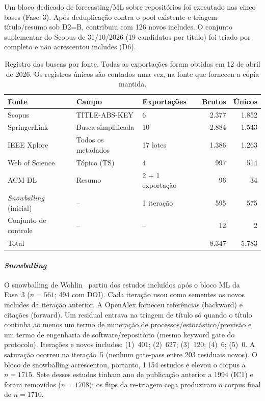 \documentclass[preprint,12pt,authoryear=false]{elsarticle}
\begin{document}
Um bloco dedicado de forecasting/ML sobre repositórios foi executado nas cinco bases (Fase~3). Após deduplicação contra o pool existente e triagem título/resumo sob D2=B, contribuiu com 126 novos includes. O conjunto suplementar do Scopus de 31/10/2026 (19 candidatos por título) foi triado por completo e não acrescentou includes (D6).

\begin{table}[t]
\centering\small
\caption{Registro das buscas por fonte. Todas as exportações foram obtidas em 12 de abril de 2026. Os registros únicos são contados uma vez, na fonte que forneceu a cópia mantida.}\label{tab:search}
\footnotesize
\begin{tabular}{lllrr}
\toprule
Fonte & Campo & Exportações & Brutos & Únicos \\
\midrule
Scopus & TITLE-ABS-KEY & 6 & 2.377 & 1.852 \\
SpringerLink & Busca simplificada & 10 & 2.884 & 1.543 \\
IEEE Xplore & Todos os metadados & 17 lotes & 1.386 & 1.263 \\
Web of Science & Tópico (TS) & 4 & 997 & 514 \\
ACM DL & Resumo & 2 + 1 exportação & 96 & 34 \\
\emph{Snowballing} (inicial) & -- & 1 iteração & 595 & 575 \\
Conjunto de controle & -- & -- & 12 & 2 \\
\midrule
Total & & & 8.347 & 5.783 \\
\bottomrule
\end{tabular}
\end{table}

\paragraph{\emph{Snowballing}}
O snowballing de Wohlin~\cite{wohlin2014} partiu dos estudos incluídos após o bloco ML da Fase~3 ($n = 561$; 494 com DOI). Cada iteração usou como sementes os novos includes da iteração anterior. A OpenAlex forneceu referências (backward) e citações (forward). Um residual entrava na triagem de título só quando o título continha ao menos um termo de mineração de processos/estocástico/previsão e um termo de engenharia de software/repositório (mesmo keyword gate do protocolo). Iterações e novos includes: (1)~401; (2)~627; (3)~120; (4)~6; (5)~0. A saturação ocorreu na iteração~5 (nenhum gate-pass entre 203 residuais novos). O bloco de snowballing acrescentou, portanto, 1\,154 estudos e elevou o corpus a $n = 1715$. Sete desses estudos tinham ano de publicação anterior a 1994 (IC1) e foram removidos ($n = 1708$); os flips da re-triagem cega produziram o corpus final de $n = 1710$.
\end{document}
